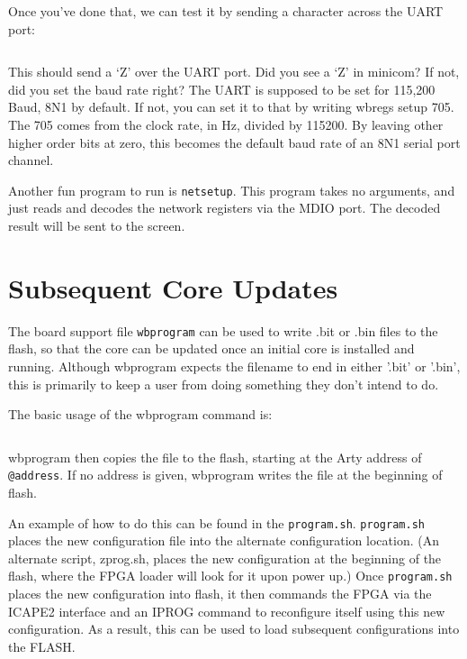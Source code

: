 \documentclass{gqtekspec}
\begin{document}
Once you've done that, we can test it by sending a character across the UART
port:
\begin{lstlisting}[language=bash]
% wbregs tx 90
\end{lstlisting}
This should send a `Z' over the UART port.  Did you see a `Z' in minicom?
If not, did you set the baud rate right?  The UART is supposed to be set
for 115,200 Baud, 8N1 by default.  If not, you can set it to that by writing
wbregs setup 705.  The 705 comes from the clock rate, in Hz, divided by 
115200.  By leaving other higher order bits at zero, this becomes the default
baud rate of an 8N1 serial port channel.

Another fun program to run is {\tt netsetup}.  This program takes no arguments,
and just reads and decodes the network registers via the MDIO port.  The
decoded result will be sent to the screen.

\section{Subsequent Core Updates}
The board support file {\tt wbprogram} can be used to write .bit or .bin
files to the flash, so that the core can be updated once an initial core
is installed and running. 
Although wbprogram expects the filename to end in either '.bit' or '.bin',
this is primarily to keep a user from doing something they don't intend to
do.

The basic usage of the wbprogram command is:
\begin{lstlisting}[language=bash]
% wbprogram [@address] file
\end{lstlisting}
wbprogram then copies the file to the flash, starting at the Arty address
of {\tt @address}.  If no address is given, wbprogram writes the file at the 
beginning of flash.

An example of how to do this can be found in the {\tt program.sh}.
{\tt program.sh} places the new configuration file into the alternate
configuration location.  (An alternate script, zprog.sh, places the new
configuration at the beginning of the flash, where the FPGA loader will look
for it upon power up.)  Once {\tt program.sh} places the new configuration
into flash, it then commands the FPGA via the ICAPE2 interface and an IPROG
command to reconfigure itself using this new configuration.  As a result, this
can be used to load subsequent configurations into the FLASH.
\end{document}
